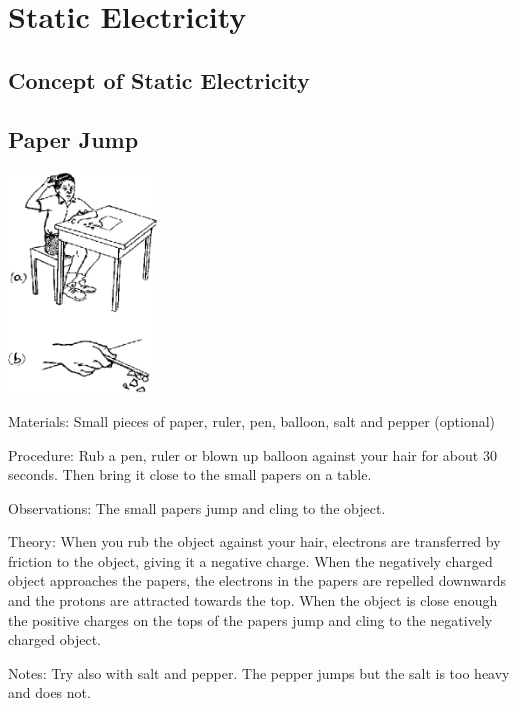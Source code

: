 \section{Static Electricity} 

\begin{multicols}{2}


\section*{Concept of Static Electricity}


\subsection{Paper Jump}

\begin{center}
\includegraphics[width=0.3\textwidth]{./img/source/static-elec.png}
\end{center}

\begin{description*}
\item[Materials:]{Small pieces of paper, ruler, pen, balloon, salt and pepper (optional)}
\item[Procedure:]{Rub a pen, ruler or blown up balloon against your hair for about 30 seconds. Then bring it close to the small papers on a table.}
\item[Observations:]{The small papers jump and cling to the object.}
\item[Theory:]{When you rub the object against your hair, electrons are transferred by friction to the object, giving it a negative charge. When the negatively charged object approaches the papers, the electrons in the papers are repelled downwards and the protons are attracted towards the top. When the object is close enough the positive charges on the tops of the papers jump and cling to the negatively charged object.}
\item[Notes:]{Try also with salt and pepper. The pepper jumps but the salt is too heavy and does not.}
\end{description*}


\end{multicols}

